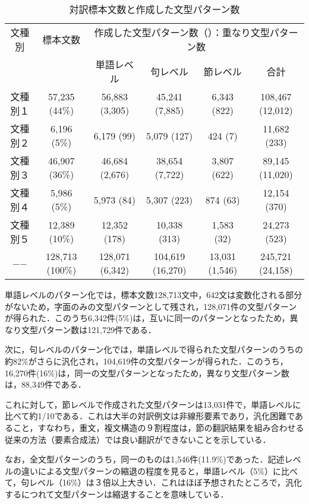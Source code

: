 \documentclass{nlp}
\begin{document}
\begin{table}[!htbp]
\footnotesize
\begin{center}
\caption{対訳標本文数と作成した文型パターン数}
\begin{tabular}{|c|c|c|c|c|c|}
\hline
文種別 & 標本文数 & \multicolumn{4}{|c|}{作成した文型パターン数（）：重なり文型パターン数} \\ \cline{3-6}
 & & 単語レベル & 句レベル & 節レベル & 合計 \\ \hline
文種別１ & 57,235 (44\%) & 56,883 (3,305) & 45,241 (7,885) & 6,343 (822) & 108,467 (12,012) \\ \hline
文種別２ & 6,196 (5\%) & 6,179 (99) & 5,079 (127) & 424 (7) & 11,682 (233) \\ \hline
文種別３ & 46,907 (36\%) & 46,684 (2,676) & 38,654 (7,722) & 3,807 (622)  & 89,145 (11,020) \\ \hline
文種別４ & 5,986 (5\%) & 5,973 (84)  & 5,307 (223) & 874 (63) & 12,154 (370) \\ \hline
文種別５ & 12,389 (10\%) & 12,352 (178)  & 10,338 (313)  & 1,583 (32)  & 24,273 (523) \\ \hline
 −−   & 128,713 (100\%) & 128,071 (6,342) & 104,619 (16,270) & 13,031 (1,546) & 245,721 (24,158) \\ \hline
\end{tabular}
\end{center}
\end{table}

単語レベルのパターン化では，標本文数128,713文中，642文は変数化される部分がないため，字面のみの文型パターンとして残され，128,071件の文型パターンが得られた．このうち6,342件(5\%)は，互いに同一のパターンとなったため，異なり文型パターン数は121,729件である．

次に，句レベルのパターン化では，単語レベルで得られた文型パターンのうちの約82\%がさらに汎化され，104,619件の文型パターンが得られた．このうち，16,270件(16\%)は，同一の文型パターンとなったため，異なり文型パターン数は，88,349件である．

これに対して，節レベルで作成された文型パターンは13,031件で，単語レベルに比べて約1/10である．これは大半の対訳例文は非線形要素であり，汎化困難であること，すなわち，重文，複文構造の９割程度は，節の翻訳結果を組み合わせる従来の方法（要素合成法）では良い翻訳ができないことを示している．

なお，全文型パターンのうち，同一のものは1,546件(11.9\%)であった．記述レベルの違いによる文型パターンの縮退の程度を見ると，単語レベル（5\%）に比べて，句レベル（16\%）は３倍以上大きい．これはほぼ予想されたところで，汎化するにつれて文型パターンは縮退することを意味している．
\end{document}
